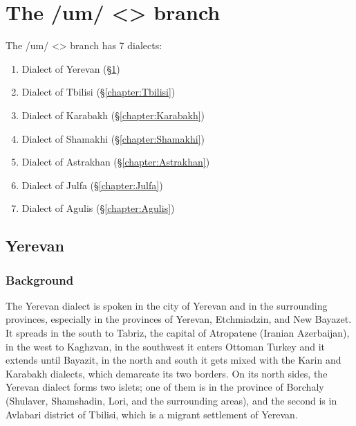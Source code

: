 \part{The /um/ <> branch}

The /um/ <> branch has 7 dialects:

\begin{enumerate}
	\item Dialect of Yerevan (\S\ref{chapter:Yerevan})
	\item Dialect of Tbilisi (\S\ref{chapter:Tbilisi})
	\item Dialect of Karabakh (\S\ref{chapter:Karabakh})
	\item Dialect of Shamakhi (\S\ref{chapter:Shamakhi})
	\item Dialect of Astrakhan (\S\ref{chapter:Astrakhan})
	\item Dialect of Julfa (\S\ref{chapter:Julfa})
	\item Dialect of Agulis (\S\ref{chapter:Agulis})
	
\end{enumerate}




\chapter{Yerevan}\label{chapter:Yerevan}



\begin{adjarianpage}\label{page:37}\end{adjarianpage}%

\section{Background}
The Yerevan dialect is spoken in the city of Yerevan and in the surrounding provinces, especially in the provinces of Yerevan, Etchmiadzin, and New Bayazet. It spreads in the south   to Tabriz, the capital of Atropatene (Iranian Azerbaijan), in the west to Kaghzvan, in the southwest   it enters Ottoman Turkey and it extends until Bayazit, in the north and south  it gets mixed with the Karin and Karabakh dialects, which demarcate its two borders. On its north sides, the Yerevan dialect forms two islets; one of them is in the province of Borchaly (Shulaver, Shamshadin, Lori, and the surrounding areas), and the second is in Avlabari district of Tbilisi, which is a migrant settlement of Yerevan. 




